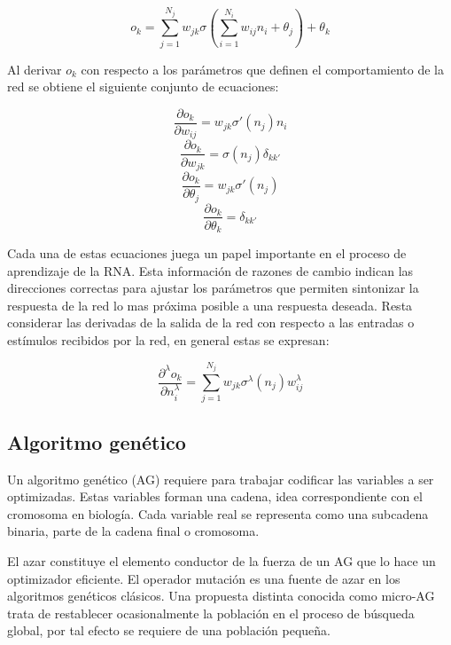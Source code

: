 \begin{equation}
	o_k=\sum^{N_j}_{j=1}w_{jk}\sigma(\sum^{N_i}_{i=1}w_{ij}n_i+\theta_j)+\theta_k
\end{equation}

Al derivar $o_k$ con respecto a los par\'ametros que definen
el comportamiento de la red se obtiene el siguiente conjunto
de ecuaciones:

\begin{equation}
	\frac{\partial o_k}{\partial w_{ij}}=w_{jk}\sigma' (n_j)n_i
\end{equation}
\begin{equation}
	\frac{\partial o_k}{\partial w_{jk}}=\sigma (n_j)\delta_{kk'}
\end{equation}
\begin{equation}
	\frac{\partial o_k}{\partial \theta_j}=w_{jk}\sigma' (n_j)
\end{equation}
\begin{equation}
	\frac{\partial o_k}{\partial \theta_k}=\delta_{kk'}
\end{equation}


Cada una de estas ecuaciones juega un papel importante
en el proceso de aprendizaje de la RNA. Esta informaci\'on
de razones de cambio indican las direcciones correctas para
ajustar los par\'ametros que permiten sintonizar la respuesta de
la red lo mas pr\'oxima posible a una respuesta deseada. Resta
considerar las derivadas de la salida de la red con respecto a
las entradas o est\'imulos recibidos por la red, en general estas
se expresan:

\begin{equation}
	\frac{\partial^\lambda o_k}{\partial n_i^\lambda}=\sum^{N_j}_{j=1}w_{jk}\sigma^\lambda(n_j)w_{ij}^\lambda
	\label{lamda}
\end{equation}

\subsection{Algoritmo gen\'etico}

Un algoritmo gen\'etico (AG) requiere para trabajar codificar
las variables a ser optimizadas. Estas variables forman
una cadena, idea correspondiente con el cromosoma en biolog\'ia.
Cada variable real se representa como una subcadena
binaria, parte de la cadena final o cromosoma.

El azar constituye el elemento conductor de la fuerza de
un AG que lo hace un optimizador eficiente. El operador mutaci\'on
es una fuente de azar en los algoritmos gen\'eticos cl\'asicos.
Una propuesta distinta conocida como micro-AG trata
de restablecer ocasionalmente la poblaci\'on en el proceso de
b\'usqueda global, por tal efecto se requiere de una poblaci\'on
peque\~na.

